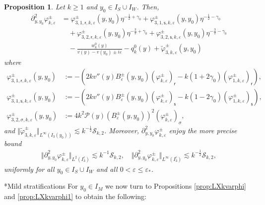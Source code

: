 \documentclass[11pt,reqno]{amsproc}
\makeatletter
\renewcommand\subsubsection{\@startsection{subsubsection}{3}%
\normalparindent{.5\linespacing\@plus.7\linespacing}{-.5em}
{\normalfont\bfseries}}
\newtheorem{proposition}{Proposition}[section]
\theoremstyle{definition}
\numberwithin{equation}{section}
\newcommand{\sr}{{\mathsf{r}}}
\newcommand{\s}{{\mathsf{s}}}
\newcommand{\cS}{{\mathcal S}}
\newcommand{\ep}{\varepsilon}
\renewcommand{\P}{{\mathcal{P}}}
\makeatother
\begin{document}
\begin{proposition}\label{prop:Xkpypynotvarphi}
Let $k\geq 1$ and $y_0\in I_S\cup I_W$. Then,
\begin{equation}\label{eq:decomXkpypynotvarphi}
\begin{split}
\partial_{y,y_0}^2\varphi_{k,\ep}^\pm &= \varphi_{3,1,\sr,k,\ep}^\pm(y,y_0) \eta^{-\frac12+\gamma_0} + \varphi_{3,1,\s,k,\ep}^\pm(y,y_0) \eta^{-\frac12-\gamma_0} \\
&\quad + \varphi_{3,2,\sr,k,\ep}^\pm(y,y_0) \eta^{-\frac32+\gamma_0} + \varphi_{3,2,\s,k,\ep}^\pm(y,y_0) \eta^{-\frac32-\gamma_0} \\ 
&\quad - \frac{ w_k^0(y)}{v(y) - v(y_0) \pm i\ep} - q_k^0(y) + \widetilde\varphi_{3,k,\ep}^\pm(y,y_0) 
\end{split}
\end{equation}
where
\begin{align*}
\varphi_{3,1,\sr,k,\ep}^\pm(y,y_0) &:= -\left( 2kv''(y)B_{\ep}^\pm(y,y_0)  \left( \varphi_{k,\ep}^\pm \right)_\sr - k(1+2\gamma_0) \left( \varphi_{1,k,\ep}^\pm \right)_\sr \right),  \\
\varphi_{3,1,\s,k,\ep}^\pm(y,y_0) &:=-\left( 2kv''(y)B_{\ep}^\pm(y,y_0)  \left( \varphi_{k,\ep}^\pm \right)_\s - k(1-2\gamma_0) \left( \varphi_{1,k,\ep}^\pm \right)_\s \right), \\
\varphi_{3,2,\sigma,k,\ep}^\pm(y,y_0) &:=  4k^2\P(y) (B_{\ep}^\pm(y,y_0))^2  \left( \varphi_{k,\ep}^\pm \right)_\sigma, 
\end{align*}
and $\Vert \widetilde{\varphi}_{3,k,\ep}^\pm \Vert_{L^\infty(I_3(y_0))} \lesssim k^{-\frac12}\cS_{k,2}$. Moreover, $\partial_{y,y_0}^2\varphi_{k,\ep}^\pm$ enjoy the more precise bound
\begin{align*}
\Vert \partial_{y,y_0}^2\varphi_{k,\ep}^\pm \Vert_{L^2(I_3^c)} \lesssim  k^{-1}\cS_{k,2}, \quad \Vert \partial_{y,y_0}^2\varphi_{k,\ep}^\pm \Vert_{L^\infty(I_3^c)} \lesssim k^{-\frac12}\cS_{k,2},
\end{align*}
uniformly for all $y_0\in I_S\cup I_{W}$ and all $0 < \ep\leq \ep_*$.
\end{proposition}


\subsubsection*{Mild stratifications}
For $y_0\in I_M$ we now turn to Propositions \ref{prop:LXkvarphi} and \ref{prop:LXkvarphi1} to obtain the following:
\end{document}
